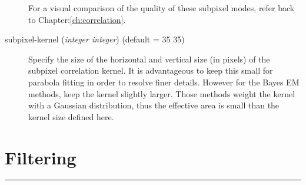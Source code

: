 \begin{description}
  For a visual comparison of the quality of these subpixel modes,
  refer back to Chapter:\ref{ch:correlation}.

\item[subpixel-kernel \textnormal{\small{(\emph{integer integer})}} (default = 35 35)]
  Specify the size of the horizontal and vertical size (in pixels) of
  the subpixel correlation kernel. It is advantageous to keep this
  small for parabola fitting in order to resolve finer
  details. However for the Bayes EM methods, keep the kernel slightly
  larger. Those methods weight the kernel with a Gaussian
  distribution, thus the effective area is small than the kernel size
  defined here.

\end{description}


\section{Filtering}
\label{filter_options}

\hrule
\bigskip

